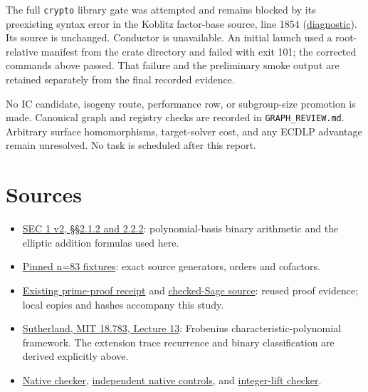 \documentclass[
  10pt,
]{article}
\providecommand{\tightlist}{%
  \setlength{\itemsep}{0pt}\setlength{\parskip}{0pt}}
\begin{document}
The full \texttt{crypto} library gate was attempted and remains blocked
by its preexisting syntax error in the Koblitz factor-base source, line
1854
(\href{../../runs/run-20261012T0331Z/root_library_gate.log}{diagnostic}).
Its source is unchanged. Conductor is unavailable. An initial launch
used a root-relative manifest from the crate directory and failed with
exit 101; the corrected commands above passed. That failure and the
preliminary smoke output are retained separately from the final recorded
evidence.

No IC candidate, isogeny route, performance row, or subgroup-size
promotion is made. Canonical graph and registry checks are recorded in
\texttt{GRAPH\_REVIEW.md}. Arbitrary surface homomorphisms,
target-solver cost, and any ECDLP advantage remain unresolved. No task
is scheduled after this report.

\section{Sources}\label{sources}

\begin{itemize}
\tightlist
\item
  \href{https://www.secg.org/sec1-v2.pdf}{SEC 1 v2, §§2.1.2 and 2.2.2}:
  polynomial-basis binary arithmetic and the elliptic addition formulas
  used here.
\item
  \href{https://github.com/aburan28/crypto/blob/8f7f796d694fd41b4db81b25c1aff3632d012c65/src/cryptanalysis/koblitz_index_calculus.rs\#L975}{Pinned
  n=83 fixtures}: exact source generators, orders and cofactors.
\item
  \href{https://github.com/aburan28/crypto/blob/8f7f796d694fd41b4db81b25c1aff3632d012c65/research/f6_wide_n83_20261004/prime-check.txt}{Existing
  prime-proof receipt} and
  \href{https://github.com/aburan28/crypto/blob/8f7f796d694fd41b4db81b25c1aff3632d012c65/research/f6_wide_n83_20261004/prime_check.sage}{checked-Sage
  source}: reused proof evidence; local copies and hashes accompany this
  study.
\item
  \href{https://math.mit.edu/classes/18.783/2023/LectureNotes13.pdf}{Sutherland,
  MIT 18.783, Lecture 13}: Frobenius characteristic-polynomial
  framework. The extension trace recurrence and binary classification
  are derived explicitly above.
\item
  \href{../../../../tools/ecdlp-surfaces/src/binary.rs}{Native checker},
  \href{../../../../tools/ecdlp-surfaces/tests/binary.rs}{independent
  native controls}, and
  \href{../../../../docs/ecdlp-surfaces/certificates/src/bin/binary_identities.rs}{integer-lift
  checker}.
\end{itemize}
\end{document}
